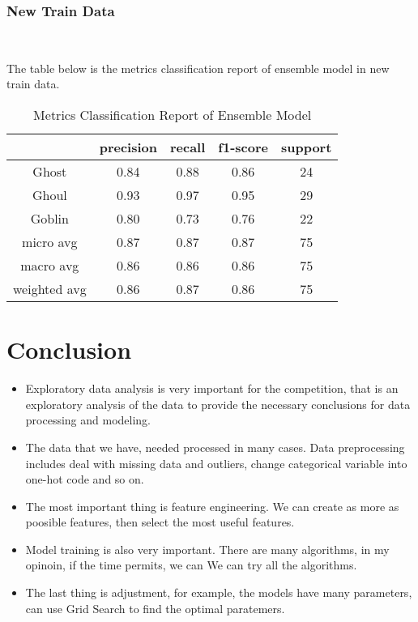 \subsubsection{New Train Data}
\

The table below is the metrics classification report 
of ensemble model in new train data.
\begin{table}[h]  \centering
	\caption{Metrics Classification Report of Ensemble Model}
	\label{tbl:metrics_classification_ensemble_new}
	\begin{tabular}{ccccc}
		\hline
		&precision & recall & f1-score & support\\
		\hline
		Ghost  &  0.84  &  0.88  & 0.86 &  24\\
		Ghoul  &  0.93  & 0.97 &  0.95 &   29\\
		Goblin  &  0.80 &  0.73  & 0.76  &  22\\
		\hline
		micro avg & 0.87  & 0.87  & 0.87  & 75\\
		macro avg &  0.86  &  0.86 & 0.86 &   75\\
		weighted avg  &  0.86 & 0.87  &  0.86  &  75\\
		\hline 
	\end{tabular}
\end{table}	


\section{Conclusion}

\begin{itemize}
	\item Exploratory data analysis is 
	very important for the competition,
	that is an exploratory analysis 
	of the data to 
	provide the necessary conclusions 
	for data processing and modeling. 
	\item The data that we have,
	needed processed in many cases.
	Data preprocessing includes 
	deal with missing data and outliers,
	change categorical variable 
	into one-hot code and so on.
	\item The most important thing is
	feature engineering.
	We can create as more as poosible features,
	then select the most useful features.
	\item Model training is also very important.
	There are many algorithms, 
	in my opinoin, 
	if the time permits,
	we can We can try all the algorithms. 
	\item The last thing is adjustment,
	for example,
	the models have many parameters,
	can use Grid Search to find 
	the optimal paratemers.	
\end{itemize}











